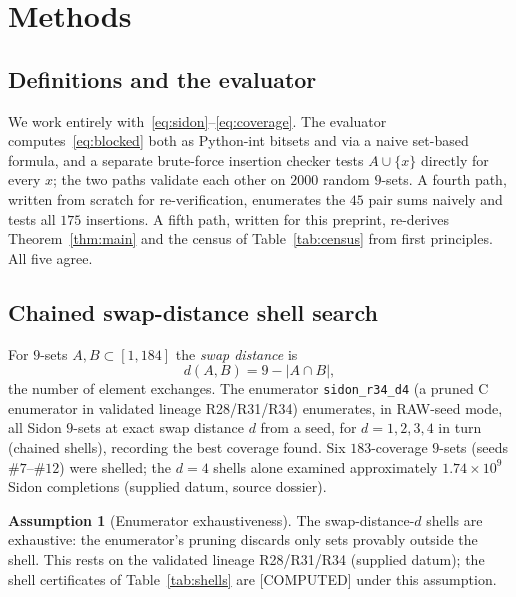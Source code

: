 \documentclass[11pt,a4paper]{article}
\theoremstyle{definition}
\newtheorem{assumption}{Assumption}
\begin{document}
\section{Methods}

\subsection{Definitions and the evaluator}

We work entirely with~\eqref{eq:sidon}--\eqref{eq:coverage}. The evaluator
computes~\eqref{eq:blocked} both as Python-int bitsets and via a naive
set-based formula, and a separate brute-force insertion checker tests
$A\cup\{x\}$ directly for every $x$; the two paths validate each other
on $2000$ random $9$-sets. A fourth path, written from scratch for
re-verification, enumerates the $45$ pair sums naively and tests all $175$
insertions. A fifth path, written for this preprint, re-derives
Theorem~\ref{thm:main} and the census of Table~\ref{tab:census} from
first principles. All five agree.

\subsection{Chained swap-distance shell search}

For $9$-sets $A,B\subset[1,184]$ the \emph{swap distance} is
\begin{equation}
  \label{eq:swapdist}
  d(A,B)=9-|A\cap B|,
\end{equation}
the number of element exchanges. The enumerator \texttt{sidon\_r34\_d4}
(a pruned C enumerator in validated lineage R28/R31/R34) enumerates, in
RAW-seed mode, all Sidon $9$-sets at exact swap distance $d$ from a seed,
for $d=1,2,3,4$ in turn (chained shells), recording the best coverage
found. Six $183$-coverage $9$-sets (seeds $\#7$--$\#12$) were shelled;
the $d=4$ shells alone examined approximately $1.74\times10^9$ Sidon
completions (supplied datum, source dossier).

\begin{assumption}[Enumerator exhaustiveness]
  \label{asm:enum}
  The swap-distance-$d$ shells are exhaustive: the enumerator's pruning
  discards only sets provably outside the shell. This rests on the
  validated lineage R28/R31/R34 (supplied datum); the shell certificates
  of Table~\ref{tab:shells} are [COMPUTED] under this assumption.
\end{assumption}
\end{document}
